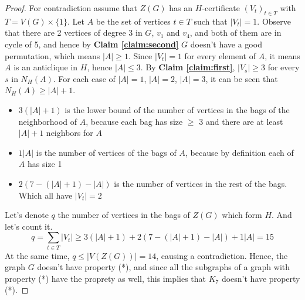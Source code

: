 \begin{proof}
    For contradiction assume that $Z(G)$ has an $H$-certificate $(V_{t})_{t \in T}$ with $T = V(G) \times \{1\}$.
    Let $A$ be the set of vertices $t \in T$ such that $|V_t| = 1$. Observe that there are 2 vertices of degree 3 in $G$,
    $v_1$ and $v_4$, and both of them are in cycle of 5, and hence by \textbf{Claim \ref{claim:second}} $G$ doesn't
    have a good permutation, which means $|A| \geq 1$. Since $|V_{t}| = 1$ for every element of $A$, it means
    $A$ is an anticlique in $H$, hence $|A| \leq 3$. By \textbf{Claim \ref{claim:first}}, $|V_s| \geq 3$ for every $s$ in $N_{H}(A)$.
    For each case of $|A| = 1$, $|A| = 2$, $|A| = 3$, it can be seen that $N_{H}(A) \geq |A| + 1$.
    \begin{itemize}
        \item $3(|A| + 1)$ is the lower bound of the number of vertices in the bags of the neighborhood of $A$, because each bag has size $\geq$ 3  and there are at least $|A| + 1$ neighbors for $A$
        \item $1|A|$ is the number of vertices of the bags of $A$, because by definition each of $A$ has size 1
        \item $2(7 - (|A| + 1) - |A|)$ is the number of vertices in the rest of the bags. Which all have $|V_t| = 2$
    \end{itemize}
    Let's denote $q$ the number of vertices in the bags of $Z(G)$ which form $H$. And let's count it.
    \begin{equation}
        q = \sum_{t \in T} |V_t| \geq 3(|A| + 1) + 2(7 - (|A| + 1) - |A|) + 1|A| = 15
    \end{equation}
    At the same time, $q \leq |V(Z(G))| = 14$, causing a contradiction. Hence, the graph $G$ doesn't have property (*),
    and since all the subgraphs of a graph with property (*) have the proprety as well, this implies that $K_7$ doesn't have 
    property (*).
\end{proof}